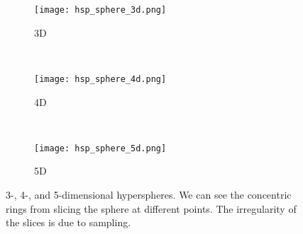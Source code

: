 \begin{figure} 
  \centering
  \begin{subfigure}[b]{0.3\linewidth}
    \texttt{[image: hsp\_sphere\_3d.png]}
    \caption{3D}
    \label{fig:spheres:3d} 
  \end{subfigure} 
  ~
  \begin{subfigure}[b]{0.3\linewidth}
    \texttt{[image: hsp\_sphere\_4d.png]}
    \caption{4D}
    \label{fig:spheres:4d} 
  \end{subfigure}
  ~
  \begin{subfigure}[b]{0.3\linewidth}
    \texttt{[image: hsp\_sphere\_5d.png]}
    \caption{5D}
    \label{fig:spheres:5d} 
  \end{subfigure}
  \caption{%
    3-, 4-, and 5-dimensional hyperspheres. We can see the concentric rings
    from slicing the sphere at different points. The irregularity of the
    slices is due to sampling.
  } 
  \label{fig:spheres} 
\end{figure}


